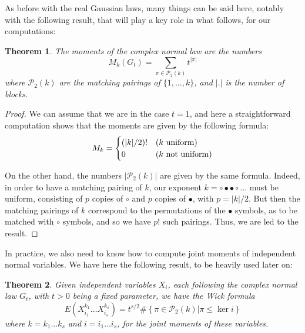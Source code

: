 \documentclass[12pt]{amsbook}
\newtheorem{theorem}{Theorem}[chapter]
\begin{document}
As before with the real Gaussian laws, many things can be said here, notably with the following result, that will play a key role in what follows, for our computations: 

\begin{theorem}
The moments of the complex normal law are the numbers
$$M_k(G_t)=\sum_{\pi\in\mathcal P_2(k)}t^{|\pi|}$$
where $\mathcal P_2(k)$ are the matching pairings of $\{1,\ldots,k\}$, and $|.|$ is the number of blocks.
\end{theorem}

\begin{proof}
We can assume that we are in the case $t=1$, and here a straightforward computation shows that the moments are given by the following formula:
$$M_k=\begin{cases}
(|k|/2)!&(k\ {\rm uniform})\\
0&(k\ {\rm not\ uniform})
\end{cases}$$

On the other hand, the numbers $|\mathcal P_2(k)|$ are given by the same formula. Indeed, in order to have a matching pairing of $k$, our exponent $k=\circ\bullet\bullet\circ\ldots$ must be uniform, consisting of $p$ copies of $\circ$ and $p$ copies of $\bullet$, with $p=|k|/2$. But then the matching pairings of $k$ correspond to the permutations of the $\bullet$ symbols, as to be matched with $\circ$ symbols, and so we have $p!$ such pairings. Thus, we are led to the result.
\end{proof}

In practice, we also need to know how to compute joint moments of independent normal variables. We have here the following result, to be heavily used later on:

\begin{theorem}
Given independent variables $X_i$, each following the complex normal law $G_t$, with $t>0$ being a fixed parameter, we have the Wick formula
$$E\left(X_{i_1}^{k_1}\ldots X_{i_s}^{k_s}\right)=t^{s/2}\#\left\{\pi\in\mathcal P_2(k)\Big|\pi\leq\ker i\right\}$$
where $k=k_1\ldots k_s$ and $i=i_1\ldots i_s$, for the joint moments of these variables.
\end{theorem}
\end{document}
